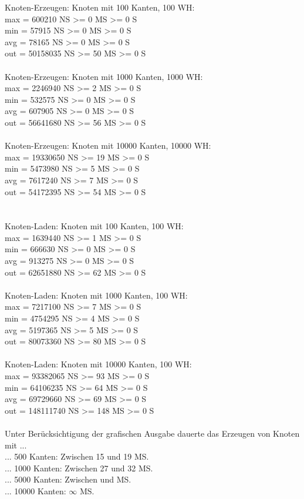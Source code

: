 \noindent
Knoten-Erzeugen: Knoten mit 100 Kanten, 100 WH:\\
max = 600210 NS >= 0 MS >= 0 S\\
min = 57915 NS >= 0 MS >= 0 S\\
avg = 78165 NS >= 0 MS >= 0 S\\
out = 50158035 NS >= 50 MS >= 0 S\\
~\\
Knoten-Erzeugen: Knoten mit 1000 Kanten, 1000 WH:\\
max = 2246940 NS >= 2 MS >= 0 S\\
min = 532575 NS >= 0 MS >= 0 S\\
avg = 607905 NS >= 0 MS >= 0 S\\
out = 56641680 NS >= 56 MS >= 0 S\\
~\\
Knoten-Erzeugen: Knoten mit 10000 Kanten, 10000 WH:\\
max = 19330650 NS >= 19 MS >= 0 S\\
min = 5473980 NS >= 5 MS >= 0 S\\
avg = 7617240 NS >= 7 MS >= 0 S\\
out = 54172395 NS >= 54 MS >= 0 S\\
~\\~\\

\noindent
Knoten-Laden: Knoten mit 100 Kanten, 100 WH:\\
max = 1639440 NS >= 1 MS >= 0 S\\
min = 666630 NS >= 0 MS >= 0 S\\
avg = 913275 NS >= 0 MS >= 0 S\\
out = 62651880 NS >= 62 MS >= 0 S\\
~\\
Knoten-Laden: Knoten mit 1000 Kanten, 100 WH:\\
max = 7217100 NS >= 7 MS >= 0 S\\
min = 4754295 NS >= 4 MS >= 0 S\\
avg = 5197365 NS >= 5 MS >= 0 S\\
out = 80073360 NS >= 80 MS >= 0 S\\
~\\
Knoten-Laden: Knoten mit 10000 Kanten, 100 WH:\\
max = 93382065 NS >= 93 MS >= 0 S\\
min = 64106235 NS >= 64 MS >= 0 S\\
avg = 69729660 NS >= 69 MS >= 0 S\\
out = 148111740 NS >= 148 MS >= 0 S\\
~\\

\noindent
Unter Berücksichtigung der grafischen Ausgabe dauerte das  Erzeugen von Knoten mit ...\\

\noindent
... 500 Kanten: Zwischen 15 und 19 MS.\\
... 1000 Kanten: Zwischen 27 und 32 MS.\\
... 5000 Kanten: Zwischen  und  MS.\\
... 10000 Kanten: $\infty$ MS.


